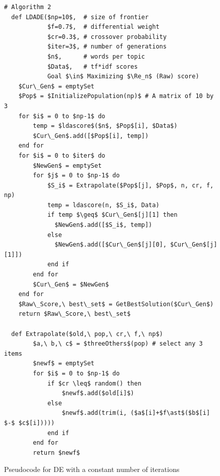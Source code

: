 \documentclass[twocolumn,5p,sort&compress]{elsarticle}
\renewcommand{\algorithmicrequire}{\textbf{Input:}}
\renewcommand{\algorithmicensure}{\textbf{Output:}}
\theoremstyle{break}
\begin{document}
\begin{figure}[!h]
\scriptsize
\begin{lstlisting}[mathescape,linewidth=8.2cm,frame=r,numbers=right]
  # Algorithm 2
  def LDADE($np=10$,  # size of frontier
            $f=0.7$,  # differential weight
            $cr=0.3$, # crossover probability
            $iter=3$, # number of generations
            $n$,      # words per topic
            $Data$,   # tf*idf scores
            Goal $\in$ Maximizing $\Re_n$ (Raw) score)
    $Cur\_Gen$ = emptySet
    $Pop$ = $InitializePopulation(np)$ # A matrix of 10 by 3
    for $i$ = 0 to $np-1$ do
        temp = $ldascore$($n$, $Pop$[i], $Data$)
        $Cur\_Gen$.add([$Pop$[i], temp])
    end for
    for $i$ = 0 to $iter$ do
        $NewGen$ = emptySet
        for $j$ = 0 to $np-1$ do
            $S_i$ = Extrapolate($Pop$[j], $Pop$, n, cr, f, np)
            temp = ldascore(n, $S_i$, Data)
            if temp $\geq$ $Cur\_Gen$[j][1] then
              $NewGen$.add([$S_i$, temp])
            else
              $NewGen$.add([$Cur\_Gen$[j][0], $Cur\_Gen$[j][1]])
            end if
        end for
        $Cur\_Gen$ = $NewGen$
    end for
    $Raw\_Score,\ best\_set$ = GetBestSolution($Cur\_Gen$)
    return $Raw\_Score,\ best\_set$
  
  def Extrapolate($old,\ pop,\ cr,\ f,\ np$)
        $a,\ b,\ c$ = $threeOthers$(pop) # select any 3 items
        $newf$ = emptySet
        for $i$ = 0 to $np-1$ do
            if $cr \leq$ random() then
                $newf$.add($old[i]$)
            else
                $newf$.add(trim(i, ($a$[i]+$f\ast$($b$[i] $-$ $c$[i]))))
            end if
        end for
        return $newf$ 
\end{lstlisting}
\caption{Pseudocode for DE with a constant number of iterations}
\label{fig:pseudo_DE}  
\end{figure}

  
            
\end{document}
